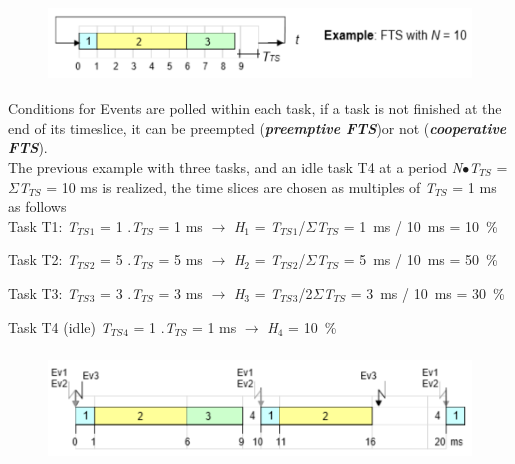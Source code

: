 	\begin{figure}[h]
    \centering
    \includegraphics[width=12cm, height=2cm]{Images/image92.png}
    \label{fig:Fig }
    \end{figure}

Conditions for Events are polled within each task, if a task is not finished at the end of its timeslice, it can be preempted (\textbf{\textit{preemptive FTS}})or not (\textbf{\textit{cooperative FTS}}).\\

The previous example with three tasks, and an idle task T4 at a period \textit{N}$\mathrm{\bullet}$\textit{T${}_{TS}$} = $\Sigma$\textit{T${}_{TS}$} = 10 ms is realized, the time slices are chosen as multiples of \textit{T${}_{TS}$} = 1 ms as follows \\

Task T1:    \textit{T${}_{TS}$}${}_{1}$ = 1 $.$\textit{T${}_{TS}$} = 1 ms $\rightarrow$ \textit{H}${}_{1}$ = \textit{T${}_{TS}$}${}_{1}$/$\Sigma$\textit{T${}_{TS}$} = 1~ms / 10~ms = 10~\%

Task T2:    \textit{T${}_{TS}$}${}_{2}$ = 5 $.$\textit{T${}_{TS}$} = 5 ms $\rightarrow$ \textit{H}${}_{2}$ = \textit{T${}_{TS}$}${}_{2}$/$\Sigma$\textit{T${}_{TS}$} = 5~ms / 10~ms = 50~\%

Task T3:     \textit{T${}_{TS}$}${}_{3}$ = 3 $.$\textit{T${}_{TS}$} = 3 ms $\rightarrow$ \textit{H}${}_{3}$ = \textit{T${}_{TS}$}${}_{3}$/2$\Sigma$\textit{T${}_{TS}$} = 3~ms / 10~ms = 30~\%

Task T4 (idle) \textit{T${}_{TS}$}${}_{4}$ = 1 $.$\textit{T${}_{TS}$} = 1 ms $\rightarrow$ \textit{H}${}_{4}$ = 10~\%

	\begin{figure}[h]
    \centering
    \includegraphics[width=13cm, height=3cm]{Images/image93.png}
    \label{fig:Fig }
    \end{figure}

